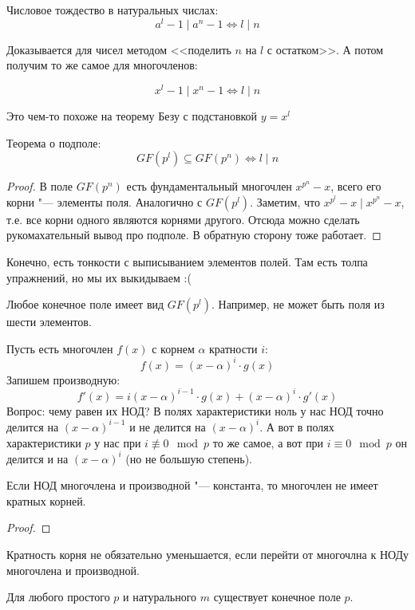 \begin{lemma}
	Числовое тождество в натуральных числах:
	\[
	a^l - 1 \mid a^n - 1 \iff l \mid n
	\]
\end{lemma}
Доказывается для чисел методом <<поделить $n$ на $l$ с остатком>>.
А потом получим то же самое для многочленов:
\begin{lemma}
	\[
	x^l - 1 \mid x^n - 1 \iff l \mid n
	\]
\end{lemma}
\begin{Rem}
	Это чем-то похоже на теорему Безу с подстановкой $y=x^l$
\end{Rem}

\begin{theorem}
	Теорема о подполе:
	\[
	GF(p^l) \subseteq GF(p^n) \iff l \mid n
	\]
\end{theorem}
\begin{proof}
В поле $GF(p^n)$ есть фундаментальный многочлен $x^{p^n}-x$,
всего его корни "--- элементы поля.
Аналогично с $GF(p^l)$.
Заметим, что $x^{p^l}-x \mid x^{p^n}-x$, т.е. все корни
одного являются корнями другого.
Отсюда можно сделать рукомахательный вывод про подполе.
В обратную сторону тоже работает.
\end{proof}
\begin{Rem}
Конечно, есть тонкости с выписыванием элементов полей.
Там есть толпа упражнений, но мы их выкидываем :(
\end{Rem}

\begin{lemma}
	Любое конечное поле имеет вид $GF(p^l)$.
	Например, не может быть поля из шести элементов.
\end{lemma}

Пусть есть многочлен $f(x)$ с корнем $\alpha$ кратности $i$:
\[
	f(x) = (x - \alpha)^i \cdot g(x)
\]
Запишем производную:
\[
	f'(x) = i(x - \alpha)^{i-1} \cdot g(x) + (x - \alpha)^i \cdot g'(x)
\]
Вопрос: чему равен их НОД?
В полях характеристики ноль у нас НОД точно делится на $(x-\alpha)^{i-1}$ и не делится на $(x-\alpha)^i$.
А вот в полях характеристики $p$ у нас при $i \nequiv 0 \mod p$
то же самое, а вот при $i \equiv 0 \mod p$ он делится и на $(x-\alpha)^i$
(но не большую степень).
\begin{conseq}
	Если НОД многочлена и производной "--- константа, то многочлен не имеет кратных корней.
\end{conseq}
\begin{proof}
	\TODO
\end{proof}
\begin{Rem}
	Кратность корня не обязательно уменьшается, если перейти от многочлна к НОДу многочлена и производной.
\end{Rem}
\begin{theorem}
	Для любого простого $p$ и натурального $m$
	существует конечное поле $p$.
\end{theorem}

